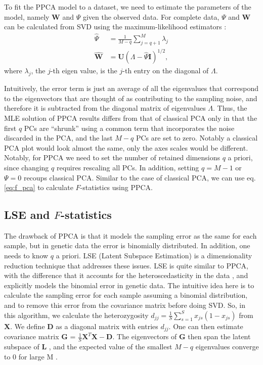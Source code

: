 \documentclass[12pt]{article}
\newcommand{\BI}{\mathbf{I}}
\newcommand{\MX}{\mathbf{X}}
\newcommand{\MG}{\mathbf{G}}
\begin{document}
To fit the PPCA model to a dataset, we need to estimate the parameters of the model, namely $\mathbf{W}$ and $\Psi$ given the observed data. For complete data, $\Psi$ and $\mathbf{W}$ can be calculated from SVD using the maximum-likelihood estimators \citep{tipping_probabilistic_1999}:
\begin{align*}
    \hat{\Psi} &= \frac{1}{M-q}\sum_{j=q+1}^M \lambda_{j}\\
    \hat{\mathbf{W}} &= \mathbf{U}(\Lambda - \hat{\Psi}\BI)^{1/2},
\end{align*}
where $\lambda_j$, the $j$-th eigen value, is the $j$-th entry on the diagonal of $\Lambda$.

Intuitively, the error term is just an average of all the eigenvalues that correspond to the eigenvectors that are thought of as contributing to the sampling noise, and therefore it is subtracted from the diagonal matrix of eigenvalues $\Lambda$. Thus, the MLE solution of PPCA results differs from that of classical PCA only in that the first $q$ PCs are ``shrunk'' using a common term that incorporates the noise discarded in the PCA, and the last $M-q$ PCs are set to zero. Notably a classical PCA plot would look almost the same, only the axes scales would be different. Notably, for PPCA we need to set the number of retained dimensions $q$ a priori, since changing $q$ requires rescaling all PCs. In addition, setting $q=M-1$ or $\Psi=0$ recoups classical PCA. Similar to the case of classical PCA, we can use eq. \ref{eq:f_pca} to calculate $F$-statistics using PPCA.

\subsection{LSE and $F$-statistics}\label{theory-lse}
The drawback of PPCA is that it models the sampling error as the same for each sample, but in genetic data the error is binomially distributed. In addition, one needs to know $q$ a priori. LSE (Latent Subspace Estimation) is a dimensionality reduction technique that addresses these issues. LSE is quite similar to PPCA, with the difference that it accounts for the heteroscedasticity in the data \citep{chen_consistent_2015}, and explicitly models the binomial error in genetic data. The intuitive idea here is to calculate the sampling error for each sample assuming a binomial distribution, and to remove this error from the covariance matrix before doing SVD. So, in this algorithm, we calculate the heterozygosity  $d_{jj} = \frac{1}{S}\sum_{s=1}^S x_{js}(1 - x_{js})$ from $\MX$. We define $\mathbf{D}$ as a diagonal matrix with entries  $d_{jj}$. One can then estimate covariance matrix $\MG$ = $\frac{1}{S}\MX^T\MX - \mathbf{D}$. The eigenvectors of $\mathbf{G}$ then span the latent subspace of $\mathbf{L}$ , and the expected value of the smallest $M-q$ eigenvalues converge to 0 for large M \citep{cabreros_likelihood-free_2019}.
\end{document}
